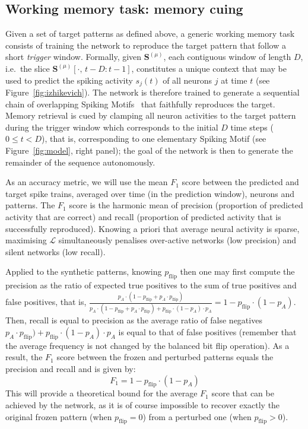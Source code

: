 \documentclass{scrartcl}
\newcommand{\citep}[1]{\parencite{#1}}
\begin{document}
\subsection{Working memory task: memory cuing}
%
Given a set of target patterns as defined above, a generic working memory task consists of training the network to reproduce the target pattern that follow a short \emph{trigger} window. Formally, given $\mathbf{S}^{(\mu)}$, each contiguous window of length $D$, i.e.\ the slice $\mathbf{S}^{(\mu)}[\cdot,\, t{-}D:t{-}1]$, constitutes a unique context that may be used to predict the spiking activity $s_j(t)$ of all neurons $j$ at time $t$ (see Figure~\ref{fig:izhikevich}). The network is therefore trained to generate a sequential chain of overlapping Spiking Motifs~\citep{Perrinet2023,Kronland-Martinet2026} that faithfully reproduces the target. Memory retrieval is cued by clamping all neuron activities to the target pattern during the trigger window which corresponds to the initial $D$ time steps ($0 \le t < D$), that is, corresponding to one elementary Spiking Motif (see Figure~\ref{fig:model}, right panel); the goal of the network is then to generate the remainder of the sequence autonomously.

As an accuracy metric, we will use the mean $F_1$ score between the predicted and target spike trains, averaged over time (in the prediction window), neurons and patterns. The $F_1$ score is the harmonic mean of precision (proportion of predicted activity that are correct) and recall (proportion of predicted activity that is successfully reproduced). Knowing a priori that average neural activity is sparse, maximising $\mathcal{L}$ simultaneously penalises over-active networks (low precision) and silent networks (low recall). 

Applied to the synthetic patterns, knowing $p_\text{flip}$ then one may first compute the precision as the ratio of expected true positives to the sum of true positives and false positives, that is, $\frac{p_A \cdot (1 - p_\text{flip} + p_A \cdot p_\text{flip})}{p_A \cdot (1 - p_\text{flip} + p_A \cdot p_\text{flip}) + p_\text{flip} \cdot (1 - p_A) \cdot p_A} = 1 - p_\text{flip} \cdot (1 - p_A)$. Then, recall is equal to precision as the average ratio of false negatives $p_A \cdot p_\text{flip}) + p_\text{flip} \cdot (1 - p_A) \cdot p_A$ is equal to that of false positives (remember that the average frequency is not changed by the balanced bit flip operation). As a result, the $F_1$ score between the frozen and perturbed patterns equals the precision and recall and is given by:
\begin{equation}
  F_1 = 1 - p_\text{flip} \cdot (1 - p_A)
  \label{eq:f1} 
\end{equation}
This will provide a theoretical bound for the average $F_1$ score that can be achieved by the network, as it is of course impossible to recover exactly the original frozen pattern (when $p_\text{flip}=0$) from a perturbed one  (when $p_\text{flip}>0$).
\end{document}
